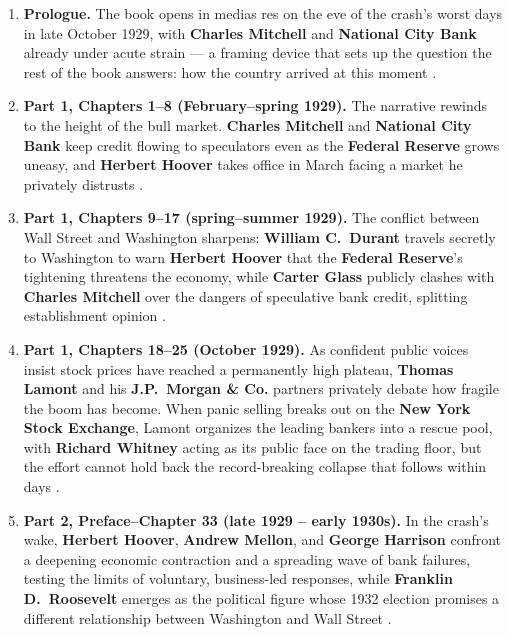 \documentclass[11pt]{article}
\newcommand{\charname}[1]{\textbf{#1}}
\begin{document}
\begin{enumerate}[leftmargin=1.6em, itemsep=0.6em]

\item \textbf{Prologue.} The book opens in medias res on the eve of the crash's worst
days in late October 1929, with \charname{Charles Mitchell} and \charname{National
City Bank} already under acute strain --- a framing device that sets up the question
the rest of the book answers: how the country arrived at this moment
\autocite{supersummaryPrologueCh8}.

\item \textbf{Part 1, Chapters 1--8 (February--spring 1929).} The narrative rewinds
to the height of the bull market. \charname{Charles Mitchell} and \charname{National
City Bank} keep credit flowing to speculators even as the \charname{Federal Reserve}
grows uneasy, and \charname{Herbert Hoover} takes office in March facing a market he
privately distrusts \autocite{wikipedia1929book,supersummaryPrologueCh8}.

\item \textbf{Part 1, Chapters 9--17 (spring--summer 1929).} The conflict between
Wall Street and Washington sharpens: \charname{William C.\ Durant} travels secretly
to Washington to warn \charname{Herbert Hoover} that the \charname{Federal Reserve}'s
tightening threatens the economy, while \charname{Carter Glass} publicly clashes with
\charname{Charles Mitchell} over the dangers of speculative bank credit, splitting
establishment opinion \autocite{supersummaryCh9to17}.

\item \textbf{Part 1, Chapters 18--25 (October 1929).} As confident public voices
insist stock prices have reached a permanently high plateau, \charname{Thomas Lamont}
and his \charname{J.P.\ Morgan \& Co.} partners privately debate how fragile the boom
has become. When panic selling breaks out on the \charname{New York Stock Exchange},
Lamont organizes the leading bankers into a rescue pool, with \charname{Richard
Whitney} acting as its public face on the trading floor, but the effort cannot hold
back the record-breaking collapse that follows within days
\autocite{supersummaryCh18to25}.

\item \textbf{Part 2, Preface--Chapter 33 (late 1929 -- early 1930s).} In the crash's
wake, \charname{Herbert Hoover}, \charname{Andrew Mellon}, and \charname{George
Harrison} confront a deepening economic contraction and a spreading wave of bank
failures, testing the limits of voluntary, business-led responses, while
\charname{Franklin D.\ Roosevelt} emerges as the political figure whose 1932 election
promises a different relationship between Washington and Wall Street
\autocite{supersummary1929,csmonitor1929}.


\end{enumerate}
\end{document}
